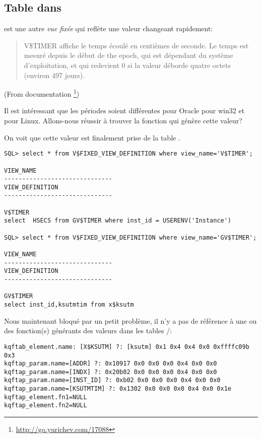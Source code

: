 \subsection{Table  dans \oracle}
\myindex{\oracle}

est une autre \emph{vue fixée} qui reflète une valeur changeant rapidement:

\begin{framed}
\begin{quotation}
V\$TIMER affiche le temps écoulé en centièmes de seconde. Le temps est mesuré depuis
le début de the epoch, qui est dépendant du système d'exploitation, et qui redevient
0 si la valeur déborde quatre octets (environ 497 jours).
\end{quotation}
\end{framed}(From \oracle documentation
\footnote{\url{http://go.yurichev.com/17088}})


Il est intéressant que les périodes soient différentes pour Oracle pour win32 et
pour Linux.
Allons-nous réussir à trouver la fonction qui génère cette valeur?

On voit que cette valeur est finalement prise de la table .

\begin{lstlisting}
SQL> select * from V$FIXED_VIEW_DEFINITION where view_name='V$TIMER';

VIEW_NAME
------------------------------
VIEW_DEFINITION
------------------------------

V$TIMER
select  HSECS from GV$TIMER where inst_id = USERENV('Instance')

SQL> select * from V$FIXED_VIEW_DEFINITION where view_name='GV$TIMER';

VIEW_NAME
------------------------------
VIEW_DEFINITION
------------------------------

GV$TIMER
select inst_id,ksutmtim from x$ksutm
\end{lstlisting}

Nous maintenant bloqué par un petit problème, il n'y a pas de référence à une ou des
fonction(s) générants des valeurs dans les tables /:

\begin{lstlisting}[caption=Résultat de \OracleTablesName]
kqftab_element.name: [X$KSUTM] ?: [ksutm] 0x1 0x4 0x4 0x0 0xffffc09b 0x3
kqftap_param.name=[ADDR] ?: 0x10917 0x0 0x0 0x0 0x4 0x0 0x0
kqftap_param.name=[INDX] ?: 0x20b02 0x0 0x0 0x0 0x4 0x0 0x0
kqftap_param.name=[INST_ID] ?: 0xb02 0x0 0x0 0x0 0x4 0x0 0x0
kqftap_param.name=[KSUTMTIM] ?: 0x1302 0x0 0x0 0x0 0x4 0x0 0x1e
kqftap_element.fn1=NULL
kqftap_element.fn2=NULL
\end{lstlisting}

